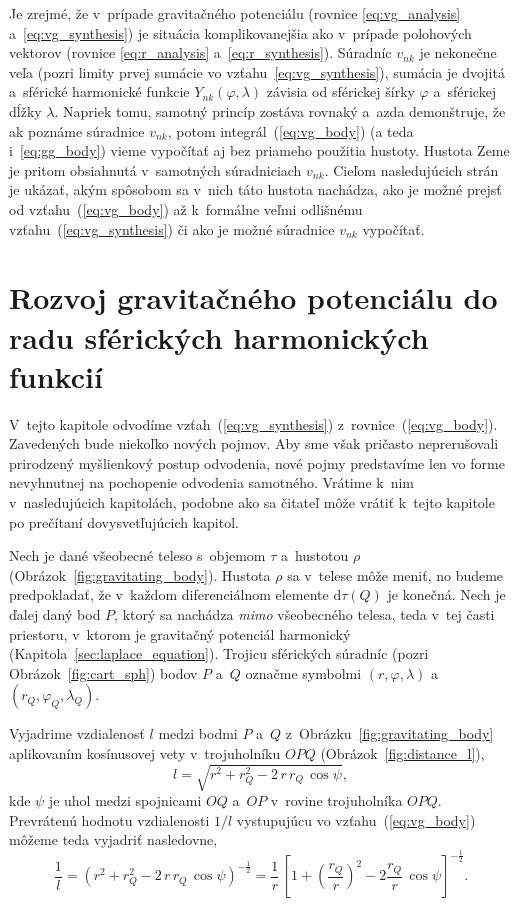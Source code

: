 \documentclass[a4paper, 12pt]{book}
\newcommand{\diff}{\mathrm d}
\begin{document}
Je zrejmé, že v~prípade gravitačného potenciálu (rovnice \ref{eq:vg_analysis} 
a~\ref{eq:vg_synthesis}) je situácia komplikovanejšia ako v~prípade polohových 
vektorov (rovnice \ref{eq:r_analysis} a~\ref{eq:r_synthesis}).  Súradníc 
$v_{nk}$ je nekonečne veľa (pozri limity prvej sumácie vo 
vzťahu~\ref{eq:vg_synthesis}), sumácia je dvojitá a~sférické harmonické funkcie 
$Y_{nk}(\varphi, \lambda)$ závisia od sférickej šírky $\varphi$ a~sférickej 
dĺžky $\lambda$.  Napriek tomu, samotný princíp zostáva rovnaký a~azda 
demonštruje, že ak poznáme súradnice $v_{nk}$, potom 
integrál~(\ref{eq:vg_body}) (a teda i~\ref{eq:gg_body}) vieme vypočítať aj bez 
priameho použitia hustoty.  Hustota Zeme je pritom obsiahnutá v~samotných 
súradniciach $v_{nk}$.  Cieľom nasledujúcich strán je ukázať, akým spôsobom sa 
v~nich táto hustota nachádza, ako je možné prejsť od vzťahu~(\ref{eq:vg_body}) 
až k~formálne veľmi odlišnému vzťahu~(\ref{eq:vg_synthesis}) či ako je možné 
súradnice $v_{nk}$ vypočítať.



\section{Rozvoj gravitačného potenciálu do radu sférických harmonických 
funkcií}
\label{sec:vg_sh_expansion}

V~tejto kapitole odvodíme vzťah~(\ref{eq:vg_synthesis}) 
z~rovnice~(\ref{eq:vg_body}).  Zavedených bude niekoľko nových pojmov.  Aby sme 
však pričasto neprerušovali prirodzený myšlienkový postup odvodenia, nové pojmy 
predstavíme len vo forme nevyhnutnej na pochopenie odvodenia samotného.  
Vrátime k~nim v~nasledujúcich kapitolách, podobne ako sa čitateľ môže vrátiť 
k~tejto kapitole po prečítaní dovysvetľujúcich kapitol.

Nech je dané všeobecné teleso s~objemom $\tau$ a~hustotou $\rho$ 
(Obrázok~\ref{fig:gravitating_body}).  Hustota $\rho$ sa v~telese môže meniť, 
no budeme predpokladať, že v~každom diferenciálnom elemente $\diff \tau(Q)$ je 
konečná.  Nech je ďalej daný bod $P$, ktorý sa nachádza \emph{mimo} všeobecného 
telesa, teda v~tej časti priestoru, v~ktorom je gravitačný potenciál harmonický 
(Kapitola~\ref{sec:laplace_equation}).  Trojicu sférických súradníc (pozri 
Obrázok~\ref{fig:cart_sph}) bodov $P$ a~$Q$ označme symbolmi $(r, \varphi, 
\lambda)$ a~$(r_Q, \varphi_Q, \lambda_Q)$.

Vyjadrime vzdialenosť $l$ medzi bodmi $P$ a~$Q$ 
z~Obrázku~\ref{fig:gravitating_body} aplikovaním kosínusovej vety 
v~trojuholníku $OPQ$ (Obrázok~\ref{fig:distance_l}),
%
\begin{equation}
l = \sqrt{r^2 + r_Q^2 - 2 \, r \, r_Q \, \cos\psi}{,}
\end{equation}
%
kde $\psi$ je uhol medzi spojnicami $OQ$ a~$OP$ v~rovine trojuholníka $OPQ$.  
Prevrátenú hodnotu vzdialenosti $1 \slash l$ vystupujúcu vo 
vzťahu~(\ref{eq:vg_body}) môžeme teda vyjadriť nasledovne,
%
\begin{equation}
\label{eq:1l}
\frac{1}{l} = \left( r^2 + r_Q^2 - 2 \, r \, r_Q \, \cos\psi 
\right)^{-\frac{1}{2}} = \frac{1}{r} \, \left[1 + \left( \dfrac{r_Q}{r} 
\right)^2 - 2 \dfrac{r_Q}{r} \, \cos\psi \right]^{-\frac{1}{2}}{.}
\end{equation}
\end{document}

